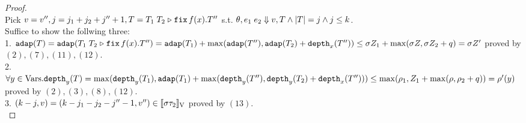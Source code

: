 \documentclass[a4paper,11pt]{article}
\theoremstyle{definition}
\begin{document}
\begin{proof}
\[{  }
\]
Pick $v = v'', j = j_1 + j_2 + j'' + 1, T =
T_1 \; T_2 \mathrel{\triangleright} {\mathop{\mathtt{fix}} f(x).T''}$ s.t. $ \theta, e_1 \; e_2
\mathrel{\Downarrow} v, T  \land |T| = j \land j \leq k $.  \\
Suffice to show the follwing three:\\
%
1. $\adap(\tr) = \adap(\trapp{\tr_1}{\tr_2}{f}{x}{\tr''}) =
\adap(\tr_1) + \max(\adap(\tr''), \adap(\tr_2) + \ddep{x}(\tr'')) \leq
%
\ienv \nnatA_1 + \max(\ienv \nnatA, \ienv \nnatA_2 + \nnatbiA) = \ienv \nnatA'$ proved by $(2),(7),(11),(12)$.\\
%
2. $\forall y \in \mbox{Vars}. \mathtt{depth}_{y}(T) = \max(\mathtt{depth}_{y}(T_1), \mathtt{adap}(T_1) +
\max(\mathtt{depth}_{y}(T''), \mathtt{depth}_{y}(T_2) + \mathtt{depth}_{x}(T''))) \leq
\max(\rho_1, Z_1 + \max(\rho, \rho_2 + q)) = \rho'(y)$
proved by $(2),(3),(8),(12)$. \\
%
3. $(k - j, v) = (k - j_1 - j_2 - j''-1, v'') \in
[\![ \sigma \tau_2 ]\!]_{\text{V}}$ proved by $(13)$.\\
%



\end{proof}
\end{document}
